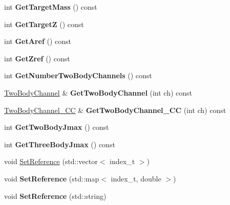 \begin{DoxyCompactItemize}
int {\bfseries Get\+Target\+Mass} () const
\item 
\mbox{\label{classModelSpace_a1ad735388c04a72a3a4331f22ed59de4}} 
int {\bfseries Get\+TargetZ} () const
\item 
\mbox{\label{classModelSpace_a86d8d2a6024c1861c6f6e18af67cc968}} 
int {\bfseries Get\+Aref} () const
\item 
\mbox{\label{classModelSpace_a5e14bcae5d3759b710e151c5a5056252}} 
int {\bfseries Get\+Zref} () const
\item 
\mbox{\label{classModelSpace_aa83b04c8ff70a21c9a6cb6df8f8aa761}} 
int {\bfseries Get\+Number\+Two\+Body\+Channels} () const
\item 
\mbox{\label{classModelSpace_adf404c6e07b30826cfdce3094da146c2}} 
\hyperlink{classTwoBodyChannel}{Two\+Body\+Channel} \& {\bfseries Get\+Two\+Body\+Channel} (int ch) const
\item 
\mbox{\label{classModelSpace_a06c1a61ef851d23bb3a75ffbf3a6c52b}} 
\hyperlink{classTwoBodyChannel__CC}{Two\+Body\+Channel\+\_\+\+CC} \& {\bfseries Get\+Two\+Body\+Channel\+\_\+\+CC} (int ch) const
\item 
\mbox{\label{classModelSpace_af813ea8960208e89437b350ed9cb6861}} 
int {\bfseries Get\+Two\+Body\+Jmax} () const
\item 
\mbox{\label{classModelSpace_a1c1a7a2c34ddc8fd25cb53131afccf4b}} 
int {\bfseries Get\+Three\+Body\+Jmax} () const
\item 
void \hyperlink{classModelSpace_a2c0036022f88a7f478e10c3d6006531e}{Set\+Reference} (std\+::vector$<$ index\+\_\+t $>$)
\item 
\mbox{\label{classModelSpace_a238be47279298ca0b5902c98972b849c}} 
void {\bfseries Set\+Reference} (std\+::map$<$ index\+\_\+t, double $>$)
\item 
\mbox{\label{classModelSpace_acec826abd780c03ea45821e05371d4e7}} 
void {\bfseries Set\+Reference} (std\+::string)
\item 

\end{DoxyCompactItemize}
